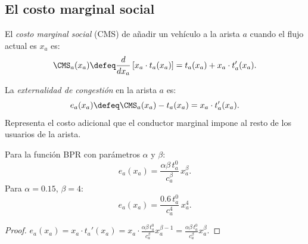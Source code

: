 \subsection{El costo marginal social}

\begin{definition}
El \emph{costo marginal social} (CMS) de añadir un vehículo a la arista $a$ cuando el flujo actual es $x_a$ es:
\[
\CMS_a(x_a) \defeq \frac{d}{dx_a}\left[ x_a \cdot t_a(x_a) \right] = t_a(x_a) + x_a \cdot t_a'(x_a).
\]
\end{definition}

\begin{definition}
La \emph{externalidad de congestión} en la arista $a$ es:
\[
e_a(x_a) \defeq \CMS_a(x_a) - t_a(x_a) = x_a \cdot t_a'(x_a).
\]
Representa el costo adicional que el conductor marginal impone al resto de los usuarios de la arista.
\end{definition}

\begin{proposition}
Para la función BPR con parámetros $\alpha$ y $\beta$:
\[
e_a(x_a) = \frac{\alpha \beta \, t_a^0}{c_a^\beta} \, x_a^\beta.
\]
Para $\alpha = 0.15$, $\beta = 4$:
\[
e_a(x_a) = \frac{0.6 \, t_a^0}{c_a^4} \, x_a^4.
\]
\end{proposition}

\begin{proof}
$e_a(x_a) = x_a \cdot t_a'(x_a) = x_a \cdot \frac{\alpha \beta \, t_a^0}{c_a^\beta} x_a^{\beta-1} = \frac{\alpha \beta \, t_a^0}{c_a^\beta} x_a^\beta$.
\end{proof}
